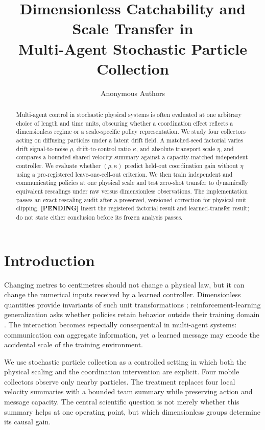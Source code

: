 \documentclass{article}
\title{Dimensionless Catchability and Scale Transfer in\\
Multi-Agent Stochastic Particle Collection}
\author{Anonymous Authors}
\date{}
\newcommand{\rhoSNR}{\rho}
\newcommand{\kappaC}{\kappa}
\newcommand{\etaT}{\eta}
\newcommand{\pending}[1]{\textcolor{red!70!black}{\textbf{[PENDING]} #1}}
\begin{document}
\maketitle

\begin{abstract}
Multi-agent control in stochastic physical systems is often evaluated at one
arbitrary choice of length and time units, obscuring whether a coordination
effect reflects a dimensionless regime or a scale-specific policy
representation. We study four collectors acting on diffusing particles under a
latent drift field. A matched-seed factorial varies drift signal-to-noise
$\rhoSNR$, drift-to-control ratio $\kappaC$, and absolute transport scale
$\etaT$, and compares a bounded shared velocity summary against a
capacity-matched independent controller. We evaluate whether $(\rhoSNR,
\kappaC)$ predict held-out coordination gain without $\etaT$ using a
pre-registered leave-one-cell-out criterion. We then train independent and
communicating policies at one physical scale and test zero-shot transfer to
dynamically equivalent rescalings under raw versus dimensionless observations.
The implementation passes an exact rescaling audit after a preserved,
versioned correction for physical-unit clipping. \pending{Insert the registered
factorial result and learned-transfer result; do not state either conclusion
before its frozen analysis passes.}
\end{abstract}

\section{Introduction}

Changing metres to centimetres should not change a physical law, but it can
change the numerical inputs received by a learned controller. Dimensionless
quantities provide invariants of such unit transformations
\citep{villar2023dimensionless}; reinforcement-learning generalization asks
whether policies retain behavior outside their training domain
\citep{sonar2021invariant}. The interaction becomes especially consequential in
multi-agent systems: communication can aggregate information, yet a learned
message may encode the accidental scale of the training environment.

We use stochastic particle collection as a controlled setting in which both the
physical scaling and the coordination intervention are explicit. Four mobile
collectors observe only nearby particles. The treatment replaces four local
velocity summaries with a bounded team summary while preserving action and
message capacity. The central scientific question is not merely whether this
summary helps at one operating point, but which dimensionless groups determine
its causal gain.
\end{document}
